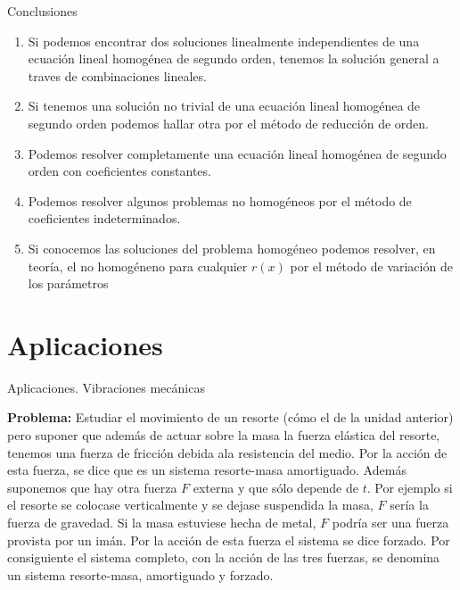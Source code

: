 \documentclass[handout,hyperref={colorlinks=true}]{beamer}
\begin{document}
\begin{frame}{Conclusiones}
\begin{enumerate}
 \item Si podemos encontrar dos soluciones linealmente independientes de una ecuación lineal homogénea de segundo orden, tenemos la solución general a traves de 
 combinaciones lineales.
 \item Si tenemos una solución no trivial de una ecuación lineal homogénea de segundo orden podemos hallar otra por el método de reducción de orden.
 \item Podemos resolver completamente una ecuación lineal homogénea de segundo orden con coeficientes constantes.
 \item Podemos resolver algunos problemas no homogéneos por el método de coeficientes indeterminados.
 \item Si conocemos las soluciones del problema homogéneo podemos resolver, en teoría, el no homogéneno para cualquier $r(x)$ por el método de variación 
 de los parámetros
\end{enumerate}

\end{frame}

\section{Aplicaciones}

\begin{frame}{Aplicaciones. Vibraciones mecánicas }
 
\textbf{Problema:} Estudiar el movimiento de un resorte (cómo el de la unidad anterior) pero suponer que además de actuar sobre la masa la fuerza elástica del resorte,
tenemos una fuerza de fricción debida ala resistencia del medio. Por la acción de esta fuerza, se dice que es un sistema resorte-masa amortiguado.
Además suponemos que hay otra fuerza $F$ externa y que sólo depende de $t$. Por ejemplo si el resorte se colocase verticalmente y se dejase suspendida 
la masa, $F$ sería la fuerza de gravedad. Si la masa estuviese hecha de metal, $F$ podría ser una fuerza provista por un imán. Por la acción de esta fuerza el sistema se 
dice forzado. Por consiguiente el sistema completo, con la acción de las tres fuerzas, se denomina un sistema resorte-masa, amortiguado y forzado.
\end{frame}
\end{document}
